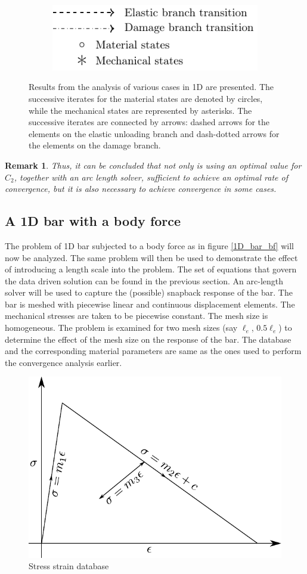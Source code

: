 \documentclass[10pt]{elsarticle}
\newtheorem*{remark}{Remark}
\begin{document}
\begin{figure}
\begin{subfigure}{0.45\textwidth}
		\centering
		\includegraphics[scale=0.9]{./conv_figs/legend.pdf}
	\end{subfigure}
	\caption{Results from the analysis of various cases in 1D are presented. The successive iterates for the material states are denoted by circles, while the mechanical states are represented by asterisks. The successive iterates are connected by arrows: dashed arrows for the elements on the elastic unloading branch and dash-dotted arrows for the elements on the damage branch.}
\end{figure}

\begin{remark}
Thus, it can be concluded that not only is using an optimal value for $C_2$, together with an arc length solver, sufficient to achieve an optimal rate of convergence, but it is also necessary to achieve convergence in some cases.
\end{remark}

\subsection{A 1D bar with a body force}
The problem of 1D bar subjected to a body force as in figure \ref{1D_bar_bf} will now be analyzed. The same problem will then be used to demonstrate the effect of introducing a length scale into the problem. The set of equations that govern the data driven solution can be found in the previous section. An arc-length solver will be used to capture the (possible) snapback response of the bar. The bar is meshed with piecewise linear and continuous displacement elements. The mechanical stresses are taken to be piecewise constant. The mesh size is homogeneous. The problem is examined for two mesh sizes (say $\ell_e$, $0.5 \ell_e$) to determine the effect of the mesh size on the response of the bar. The database and the corresponding material parameters are same as the ones used to perform the convergence analysis earlier.

\begin{figure}
	\centering
	\includegraphics[width=0.4\linewidth]{Images/database_actual.pdf}
	\caption{Stress strain database \label{database_actual}}
\end{figure}
\end{document}

